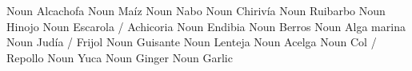             {}              {Noun}      {Alcachofa}             {}
         {}              {Noun}      {Maíz}                  {}
               {}              {Noun}      {Nabo}                  {}
              {}              {Noun}      {Chirivía}              {}
              {}              {Noun}      {Ruibarbo}              {}
               {}              {Noun}      {Hinojo}                {}
              {}              {Noun}      {Escarola / Achicoria}  {}
               {}              {Noun}      {Endibia}               {}
           {}              {Noun}      {Berros}                {}
              {}              {Noun}      {Alga marina}           {}
                 {}              {Noun}      {Judía / Frijol}        {}
                  {}              {Noun}      {Guisante}              {}
               {}              {Noun}      {Lenteja}               {}
  {}              {Noun}      {Acelga}                {}
              {}              {Noun}      {Col / Repollo}         {}
              {}              {Noun}      {Yuca}                  {}
             {}              {Noun}      {Ginger}                {}
                  {}              {Noun}      {Garlic}                {}